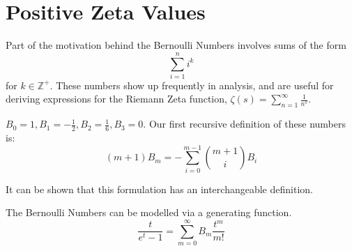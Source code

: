 \section{Positive Zeta Values}
    Part of the motivation behind the Bernoulli Numbers involves sums of the form 
    \[\sum_{i=1}^ni^k\] for $k\in \mathbb{Z}^{+}$. 
    These numbers show up frequently in analysis, and are useful for deriving expressions for 
    the Riemann Zeta function, $\zeta(s)=\sum_{n=1}^{\infty}\frac{1}{n^s}$. 
\begin{definition}
    $B_0=1,B_1=-\frac{1}{2}, B_2=\frac{1}{6}, B_3 = 0$. 
    Our first recursive definition of these numbers is:
    \[(m+1)B_m=-\sum_{i=0}^{m-1}{{m+1}\choose i} B_i\]
\end{definition}
It can be shown that this formulation has an interchangeable definition.
\begin{theorem}
    The Bernoulli Numbers can be modelled via a generating function. 
    \[\frac{t}{e^t-1}=\sum_{m=0}^{\infty}B_m\frac{t^m}{m!}\]
\end{theorem}


